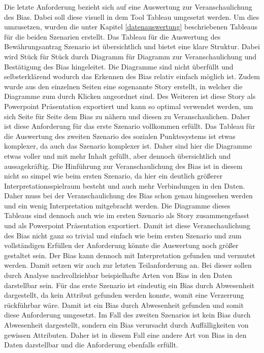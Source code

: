 \begin{onehalfspace}
Die letzte Anforderung bezieht sich auf eine Auswertung zur Veranschaulichung des Bias. Dabei soll diese visuell in dem Tool Tableau umgesetzt werden. Um dies umzusetzen, wurden die unter Kapitel \ref{datenauswertung} beschriebenen Tableaus für die beiden Szenarien erstellt. Das Tableau für die Auswertung des Bewährungsantrag Szenario ist übersichtlich und bietet eine klare Struktur. Dabei wird Stück für Stück durch Diagramm für Diagramm zur Veranschaulichung und Bestätigung des Bias hingeleitet. Die Diagramme sind nicht überfüllt und selbsterklärend wodurch das Erkennen des Bias relativ einfach möglich ist. Zudem wurde aus den einzelnen Seiten eine sogenannte Story erstellt, in welcher die Diagramme zum durch Klicken angeordnet sind. Des Weiteren ist diese Story als Powerpoint Präsentation exportiert und kann so optimal verwendet werden, um sich Seite für Seite dem Bias zu nähern und diesen zu Veranschaulichen. Daher ist diese Anforderung für das erste Szenario vollkommen erfüllt. Das Tableau für die Auswertung des zweiten Szenario des sozialen Punktesystems ist etwas komplexer, da auch das Szenario komplexer ist. Daher sind hier die Diagramme etwas voller und mit mehr Inhalt gefüllt, aber dennoch übersichtlich und aussagekräftig. Die Hinführung zur Veranschaulichung des Bias ist in diesem nicht so simpel wie beim ersten Szenario, da hier ein deutlich größerer Interpretationsspielraum besteht und auch mehr Verbindungen in den Daten. Daher muss bei der Veranschaulichung des Bias schon genau hingesehen werden und ein wenig Interpretation mitgebracht werden. Die Diagramme dieses Tableaus sind dennoch auch wie im ersten Szenario als Story zusammengefasst und als Powerpoint Präsentation exportiert. Damit ist diese Veranschaulichung des Bias nicht ganz so trivial und einfach wie beim ersten Szenario und zum vollständigen Erfüllen der Anforderung könnte die Auswertung noch größer gestaltet sein. Der Bias kann dennoch mit Interpretation gefunden und vermutet werden. Damit setzen wir auch zur letzten Teilanforderung an. Bei dieser sollen durch Analyse nachvollziehbar beispielhafte Arten von Bias in den Daten darstellbar sein. Für das erste Szenario ist eindeutig ein Bias durch Abwesenheit dargestellt, da kein Attribut gefunden werden konnte, womit eine Verzerrung rückführbar wäre. Damit ist ein Bias durch Abwesenheit gefunden und somit diese Anforderung umgesetzt. Im Fall des zweiten Szenarios ist kein Bias durch Abwesenheit dargestellt, sondern ein Bias verursacht durch Auffälligkeiten von gewissen Attributen. Daher ist in diesem Fall eine andere Art von Bias in den Daten darstellbar und die Anforderung ebenfalls erfüllt.

\end{onehalfspace}
